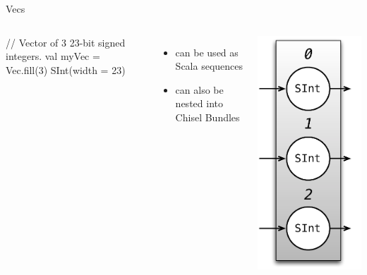 \documentclass[xcolor=pdflatex,dvipsnames,table]{beamer}
\begin{document}
\begin{frame}[fragile]{Vecs}
\begin{columns}

\begin{scala}
// Vector of 3 23-bit signed integers.
val myVec = Vec.fill(3) { SInt(width = 23) } 
\end{scala}

\begin{itemize}
\item can be used as Scala sequences
\item can also be nested into Chisel Bundles
\end{itemize}


\begin{center}
\includegraphics[height=0.9\textheight]{figs/vec-3-fix.pdf} 
\end{center}

\end{columns}
\end{frame}
\end{document}
